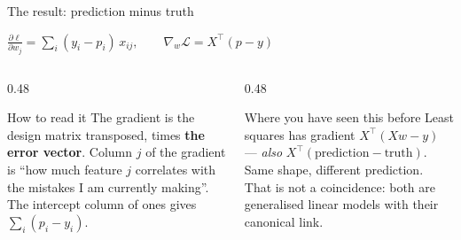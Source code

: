\documentclass[aspectratio=169]{beamer}
\begin{document}
\begin{frame}[shrink=6]{The result: prediction minus truth}
  \begin{exampleblock}{}
    \centering\large
    $\displaystyle
      \frac{\partial \ell}{\partial w_j} = \sum_i (y_i - p_i)\,x_{ij},
      \qquad
      \nabla_w \mathcal{L} = X^{\!\top}(p - y)$
  \end{exampleblock}
  \vspace{0.3em}
  \begin{columns}[T]
    \begin{column}{0.48\textwidth}
      \begin{block}{How to read it}
        \small The gradient is the design matrix transposed, times
        \textbf{the error vector}. Column $j$ of the gradient is
        ``how much feature $j$ correlates with the mistakes I am currently
        making''. The intercept column of ones gives
        $\sum_i (p_i - y_i)$.
      \end{block}
    \end{column}
    \begin{column}{0.48\textwidth}
      \begin{alertblock}{Where you have seen this before}
        \small Least squares has gradient $X^{\!\top}(Xw - y)$ ---
        \emph{also} $X^{\!\top}(\text{prediction} - \text{truth})$. Same
        shape, different prediction. That is not a coincidence: both are
        generalised linear models with their canonical link.
      \end{alertblock}
    \end{column}
  \end{columns}
\end{frame}
\end{document}
